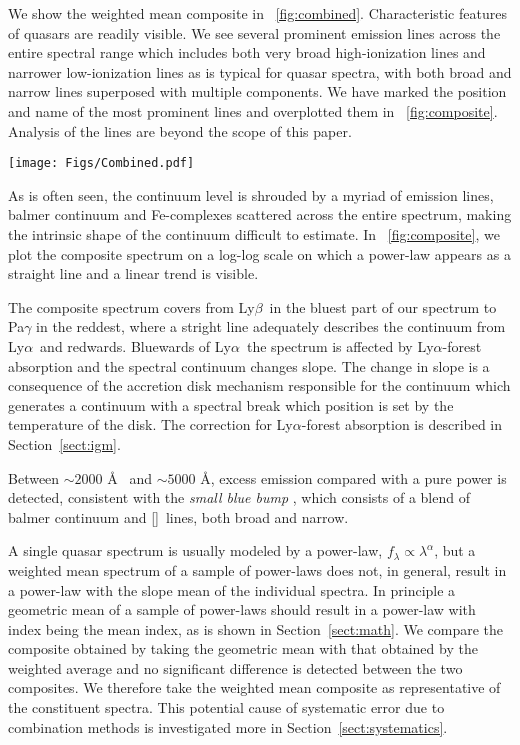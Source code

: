 \documentclass{aa}    %
\newcommand{\figref}[1]{\ref{fig:#1}}
\newcommand{\Fig}[1]{\figurename~\figref{#1}}
\newcommand{\fig}[1]{\Fig{#1}}
\newcommand{\figlabel}[1]{\label{fig:#1}}
\newcommand{\sectionname}{Section}
\newcommand{\Sect}[1]{\sectionname~\ref{sect:#1}}
\newcommand{\sect}[1]{\Sect{#1}}
\newcommand{\lya}{Ly$\alpha$}
\newcommand{\lyb}{Ly$\beta$}
\newcommand{\feii}{[\ion{Fe}{ii}]}
\newcommand{\todo}[3]{{\color{#2}\emph{#1}: #3}}
\newcommand{\jstodo}[1]{\todo{TODO }{green}{#1}}
\begin{document}
We show the weighted mean composite in \fig{combined}. Characteristic features of quasars are readily visible. We see several prominent emission lines across the entire spectral range which includes both very broad high-ionization lines and narrower low-ionization lines as is typical for quasar spectra, with both broad and narrow lines superposed with multiple components\citep{Baldwin1995}. We have marked the position and name of the most prominent lines and overplotted them in \fig{composite}.  Analysis of the lines are beyond the scope of this paper.

 \begin{figure*}[hbtp]
   \centering
   \texttt{[image: Figs/Combined.pdf]}
   \caption[]{Composite spectrum. \jstodo{First draft for figure. Re-iterate}}
  \figlabel{combined}
 \end{figure*}


As is often seen\citep{Elvis2001}, the continuum level is shrouded by a myriad of emission lines, balmer continuum and Fe-complexes scattered across the entire spectrum, making the intrinsic shape of the continuum difficult to estimate. In \fig{composite}, we plot the composite spectrum on a log-log scale on which a power-law appears as a straight line and a linear trend is visible. 

The composite spectrum covers from \lyb ~in the bluest part of our spectrum to Pa$\gamma$ in the reddest, where a stright line adequately describes the continuum from \lya~and redwards. Bluewards of \lya~the spectrum is affected by \lya-forest absorption and the spectral continuum changes slope. The change in slope is a consequence of the accretion disk mechanism responsible for the continuum which generates a continuum with a spectral break which position is set by the temperature of the disk\citep{Pereyra2006}. The correction for \lya-forest absorption is described in \sect{igm}.


 Between $\sim2000$ \AA~ and $\sim5000$ \AA, excess emission compared with a pure power is detected, consistent with  the \textit{small blue bump} \citep{Wills1985}, which consists of a blend of balmer continuum and \feii ~lines, both broad and narrow.

 A single quasar spectrum is usually modeled by a power-law, $f_{\lambda} \propto \lambda^\alpha$, but a weighted mean spectrum of a sample of power-laws does not, in general, result in a power-law with the slope mean of the individual spectra. In principle a geometric mean of a sample of power-laws should result in a power-law with index being the mean index, as is shown in \sect{math}. We compare the composite obtained by taking the geometric mean with that obtained by the weighted average and no significant difference is detected between the two composites. We therefore take the  weighted mean composite as representative of the constituent spectra. This potential cause of systematic error due to combination methods is investigated more in \sect{systematics}.
\end{document}
